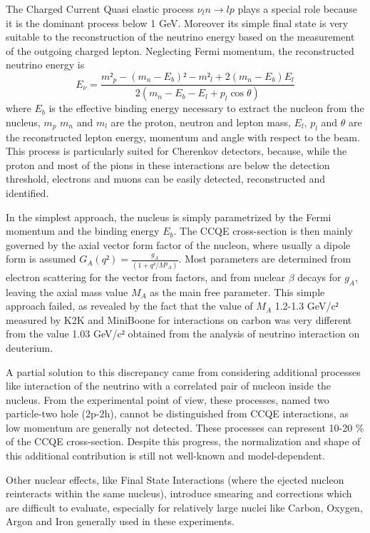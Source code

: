 The Charged Current Quasi elastic process $\nu_l n \rightarrow l p$ plays a special role because it is the dominant process below 1 GeV. Moreover its simple final state is very suitable to the reconstruction of the neutrino energy based on the measurement of the outgoing charged lepton. Neglecting Fermi momentum, the reconstructed neutrino energy is 
\begin{equation}
E_\nu = \frac{m²_p - (m_n-E_b)² - m²_l + 2 (m_n-E_b)E_l}{2 (m_n - E_b - E_l + p_l \cos \theta)}
\end{equation}
 where $E_b$ is the effective binding energy necessary to extract the nucleon from the nucleus, $m_p$ $m_n$ and $m_l$  are the proton, neutron and lepton mass, $E_l$, $p_l$ and $\theta$ are the reconstructed lepton energy, momentum and angle with respect to the beam. This process is particularly suited for Cherenkov detectors, because, while the proton and most of the pions in these interactions are below the detection threshold, electrons and muons can be easily detected, reconstructed and identified. 

In the simplest approach, the nucleus is simply parametrized by the Fermi momentum and the binding energy $E_b$. The CCQE cross-section is then mainly governed by the axial vector form factor of the nucleon, where usually a dipole form is assumed
$ G_A (q²) = \frac {g_A} {(1+q²/M²_A)}$.
Most parameters are determined from electron scattering for the vector from factors, and from nuclear $\beta$ decays for $g_A$, leaving the axial mass value $M_A$ as the main free parameter. This simple approach failed, as revealed by the fact that the value of $M_A$ 1.2-1.3 GeV/c$²$ measured by K2K and  MiniBoone for interactions on carbon was very different from the value 1.03 GeV/c$²$ obtained from the analysis of neutrino interaction on deuterium.

A partial solution to this discrepancy came from considering additional processes like interaction of the neutrino with a correlated pair of nucleon inside the nucleus. From the experimental point of view, these processes, named two particle-two hole (2p-2h), cannot be distinguished from CCQE interactions, as low momentum are generally not detected. These processes can represent 10-20 \% of the CCQE cross-section. Despite this progress, the normalization and shape of this additional contribution is still not well-known and model-dependent.

Other nuclear effects, like Final State Interactions (where the ejected nucleon reinteracts within the same nucleus), introduce smearing and corrections which are difficult to evaluate, especially for relatively large nuclei like Carbon, Oxygen, Argon and Iron generally used in these experiments. 

